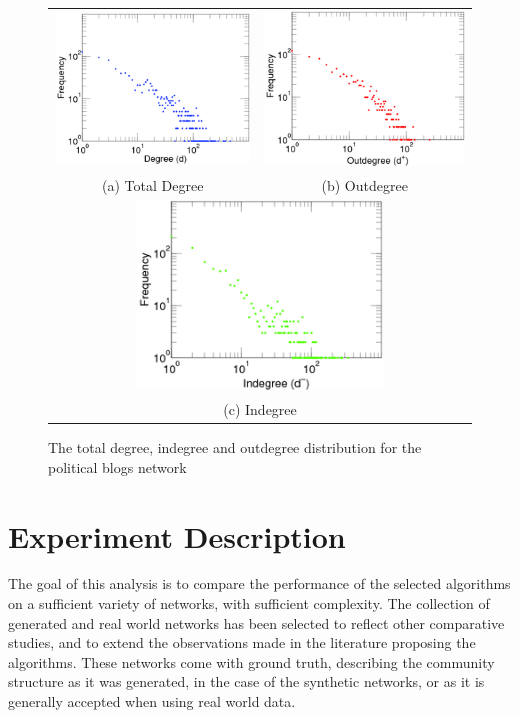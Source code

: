 \begin{figure}
	\begin{tabular}{cc}
		\includegraphics[width=65mm]{images/blogs_total.png} &   \includegraphics[width=65mm]{images/blogs_out.png} \\
		(a) Total Degree & (b) Outdegree \\[6pt]
		\multicolumn{2}{c}{\includegraphics[width=65mm]{images/blogs_in.png} }\\
		\multicolumn{2}{c}{(c) Indegree}
	\end{tabular}
	\caption{The total degree, indegree and outdegree distribution for the political blogs network\cite{Kunegis2013}}
\end{figure}


\section{Experiment Description}
The goal of this analysis is to compare the performance of the selected algorithms on a sufficient variety of networks, with sufficient complexity. The collection of generated and real world networks has been selected to reflect other comparative studies, and to extend the observations made in the literature proposing the algorithms. These networks come with ground truth, describing the community structure as it was generated, in the case of the synthetic networks, or as it is generally accepted when using real world data.

